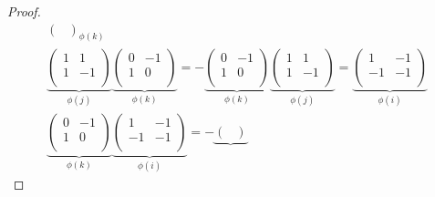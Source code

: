 \documentclass[../psets.tex]{subfiles}
\begin{document}
\begin{enumerate}
\begin{proof}
\begin{gather*}
{\begin{pmatrix}
                \end{pmatrix}
            }_{\phi(k)}\\
            \underbrace{
                \begin{pmatrix}
                    1 & 1\\
                    1 & -1\\
                \end{pmatrix}
            }_{\phi(j)}
            \underbrace{
                \begin{pmatrix}
                    0 & -1\\
                    1 & 0\\
                \end{pmatrix}
            }_{\phi(k)}
            =
            -\underbrace{
                \begin{pmatrix}
                    0 & -1\\
                    1 & 0\\
                \end{pmatrix}
            }_{\phi(k)}
            \underbrace{
                \begin{pmatrix}
                    1 & 1\\
                    1 & -1\\
                \end{pmatrix}
            }_{\phi(j)}
            =
            \underbrace{
                \begin{pmatrix}
                    1 & -1\\
                    -1 & -1\\
                \end{pmatrix}
            }_{\phi(i)}\\
            \underbrace{
                \begin{pmatrix}
                    0 & -1\\
                    1 & 0\\
                \end{pmatrix}
            }_{\phi(k)}
            \underbrace{
                \begin{pmatrix}
                    1 & -1\\
                    -1 & -1\\
                \end{pmatrix}
            }_{\phi(i)}
            =
            -\underbrace{
                \begin{pmatrix}

\end{pmatrix}}
\end{gather*}
\end{proof}
\end{enumerate}
\end{document}
